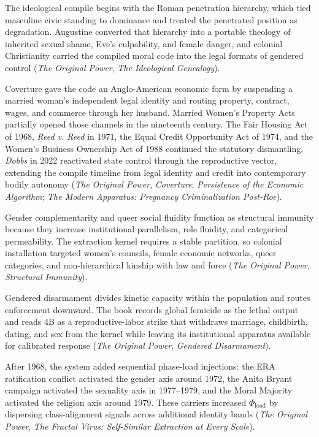 \documentclass[12pt]{article}
\newcommand{\OP}{\textit{The Original Power}}
\begin{document}
The ideological compile begins with the Roman penetration hierarchy, which tied masculine civic standing to dominance and treated the penetrated position as degradation. Augustine converted that hierarchy into a portable theology of inherited sexual shame, Eve's culpability, and female danger, and colonial Christianity carried the compiled moral code into the legal formats of gendered control (\OP{}, \textit{The Ideological Genealogy}).

Coverture gave the code an Anglo-American economic form by suspending a married woman's independent legal identity and routing property, contract, wages, and commerce through her husband. Married Women's Property Acts partially opened those channels in the nineteenth century. The Fair Housing Act of 1968, \textit{Reed v. Reed} in 1971, the Equal Credit Opportunity Act of 1974, and the Women's Business Ownership Act of 1988 continued the statutory dismantling. \textit{Dobbs} in 2022 reactivated state control through the reproductive vector, extending the compile timeline from legal identity and credit into contemporary bodily autonomy (\OP{}, \textit{Coverture}; \textit{Persistence of the Economic Algorithm}; \textit{The Modern Apparatus: Pregnancy Criminalization Post-Roe}).

Gender complementarity and queer social fluidity function as structural immunity because they increase institutional parallelism, role fluidity, and categorical permeability. The extraction kernel requires a stable partition, so colonial installation targeted women's councils, female economic networks, queer categories, and non-hierarchical kinship with law and force (\OP{}, \textit{Structural Immunity}).

Gendered disarmament divides kinetic capacity within the population and routes enforcement downward. The book records global femicide as the lethal output and reads 4B as a reproductive-labor strike that withdraws marriage, childbirth, dating, and sex from the kernel while leaving its institutional apparatus available for calibrated response (\OP{}, \textit{Gendered Disarmament}).

After 1968, the system added sequential phase-load injections: the ERA ratification conflict activated the gender axis around 1972, the Anita Bryant campaign activated the sexuality axis in 1977--1979, and the Moral Majority activated the religion axis around 1979. These carriers increased $\Phi_{\text{load}}$ by dispersing class-alignment signals across additional identity bands (\OP{}, \textit{The Fractal Virus: Self-Similar Extraction at Every Scale}).
\end{document}
